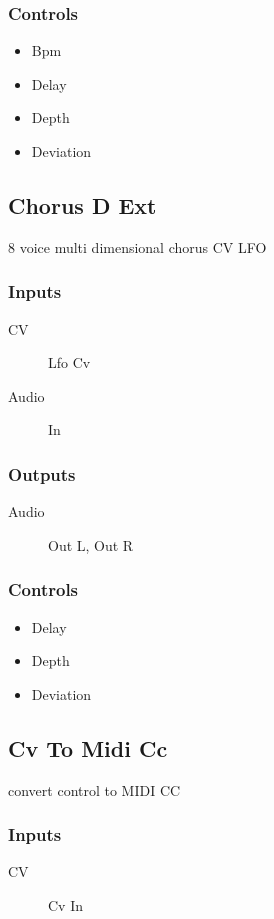 \subsubsection{Controls}
\begin{itemize}
\item Bpm
\item Delay
\item Depth
\item Deviation
\end{itemize}

\subsection{Chorus D Ext}

8 voice multi dimensional chorus CV LFO



\subsubsection{Inputs}
\begin{description}
\item [CV] Lfo Cv
\item [Audio] In
\end{description}

\subsubsection{Outputs}
\begin{description}
\item [Audio] Out L, Out R
\end{description}

\subsubsection{Controls}
\begin{itemize}
\item Delay
\item Depth
\item Deviation
\end{itemize}

\subsection{Cv To Midi Cc}

convert control to MIDI CC



\subsubsection{Inputs}
\begin{description}
\item [CV] Cv In
\end{description}

